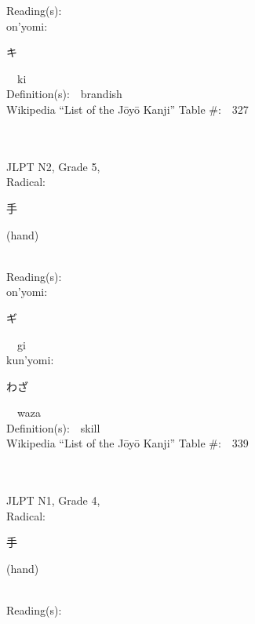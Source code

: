 \begin{multicols}{2}
Reading(s):\ \ \\
{\hspace*{1em}}on'yomi:\ \ \\
{\hspace*{2em}}{\begin{CJK}{UTF8}{min} キ \end{CJK}}\ \ ki\ \ \\
Definition(s):\ \ brandish \\
Wikipedia ``List of the J\=oy\=o Kanji'' Table \#:\ \ 327 \\
\ \ \\
{\fontsize{34pt}{40pt}  }\ \ \\  %
{JLPT N2, Grade 5, \\Radical:\ \ {\begin{CJK}{UTF8}{min} 手 \end{CJK}} (hand) } \\
Reading(s):\ \ \\
{\hspace*{1em}}on'yomi:\ \ \\
{\hspace*{2em}}{\begin{CJK}{UTF8}{min} ギ \end{CJK}}\ \ gi\ \ \\
{\hspace*{1em}}kun'yomi:\ \ \\
{\hspace*{2em}}{\begin{CJK}{UTF8}{min} わざ \end{CJK}}\ \ waza\ \ \\
Definition(s):\ \ skill \\
Wikipedia ``List of the J\=oy\=o Kanji'' Table \#:\ \ 339 \\
\ \ \\
{\fontsize{34pt}{40pt}  }\ \ \\  %
{JLPT N1, Grade 4, \\Radical:\ \ {\begin{CJK}{UTF8}{min} 手 \end{CJK}} (hand) } \\
Reading(s):\ \ \\

\end{multicols}
